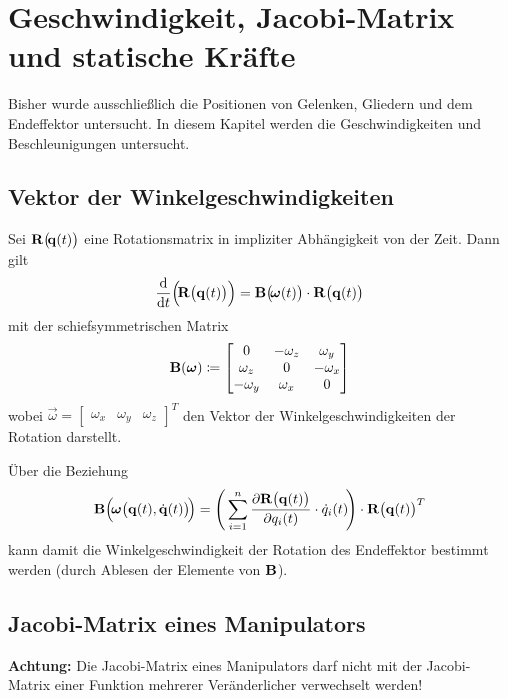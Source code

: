 \chapter{Geschwindigkeit, Jacobi-Matrix und statische Kräfte}
	Bisher wurde ausschließlich die Positionen von Gelenken, Gliedern und dem Endeffektor untersucht. In diesem Kapitel werden die Geschwindigkeiten und Beschleunigungen untersucht.

	\section{Vektor der Winkelgeschwindigkeiten}
		Sei \( \boldsymbol{\mathrm{R}}\big(\!\boldsymbol{\mathrm{q}}(t)\big) \) eine Rotationsmatrix in impliziter Abhängigkeit von der Zeit. Dann gilt
		\begin{equation*}
			\dv{t} \Big(\!\boldsymbol{\mathrm{R}}\big(\boldsymbol{\mathrm{q}}(t)\big)\Big) = \boldsymbol{\mathrm{B}}\big(\!\boldsymbol{\mathrm{\omega}}(t)\big) \cdot \boldsymbol{\mathrm{R}}\big(\boldsymbol{\mathrm{q}}(t)\big)
		\end{equation*}
		mit der schiefsymmetrischen Matrix
		\begin{equation*}
			\boldsymbol{\mathrm{B}}(\boldsymbol{\mathrm{\omega}}) \coloneqq
				\begin{bmatrix}
					0         & -\omega_z & \omega_y  \\
					\omega_z  & 0         & -\omega_x \\
					-\omega_y & \omega_x  & 0
				\end{bmatrix}
		\end{equation*}
		wobei \( \vec{\omega} = \begin{bmatrix} \omega_x & \omega_y & \omega_z \end{bmatrix}^T \) den Vektor der Winkelgeschwindigkeiten der Rotation darstellt.
		
		Über die Beziehung
		\begin{equation*}
			\boldsymbol{\mathrm{B}}\Big(\!\boldsymbol{\mathrm{\omega}}\big(\boldsymbol{\mathrm{q}}(t), \dot{\boldsymbol{\mathrm{q}}}(t)\big)\!\Big) = \Bigg( \sum_{i = 1}^{n} \frac{\partial \boldsymbol{\mathrm{R}}\big(\boldsymbol{\mathrm{q}}(t)\big)}{\partial q_i(t)} \cdot \dot{q}_i(t) \!\Bigg) \cdot \boldsymbol{\mathrm{R}}\big(\boldsymbol{\mathrm{q}}(t)\big)^T
		\end{equation*}
		kann damit die Winkelgeschwindigkeit der Rotation des Endeffektor bestimmt werden (durch Ablesen der Elemente von \(\boldsymbol{\mathrm{B}}\)).

	\section{Jacobi-Matrix eines Manipulators}
		\textbf{Achtung:} Die Jacobi-Matrix eines Manipulators darf nicht mit der Jacobi-Matrix einer Funktion mehrerer Veränderlicher verwechselt werden!
		
